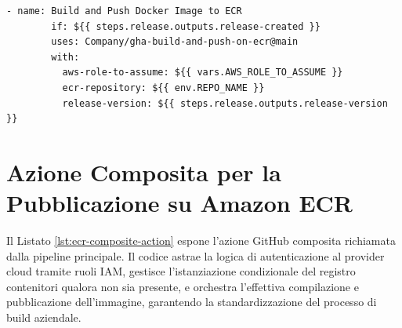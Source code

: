 \begin{lstlisting}[label={lst:ci-workflow}]
      - name: Build and Push Docker Image to ECR
        if: ${{ steps.release.outputs.release-created }}
        uses: Company/gha-build-and-push-on-ecr@main
        with:
          aws-role-to-assume: ${{ vars.AWS_ROLE_TO_ASSUME }}
          ecr-repository: ${{ env.REPO_NAME }}
          release-version: ${{ steps.release.outputs.release-version }}
\end{lstlisting}


\section{Azione Composita per la Pubblicazione su Amazon ECR}
Il Listato \ref{lst:ecr-composite-action} espone l'azione GitHub composita richiamata dalla pipeline principale. Il codice astrae la logica di autenticazione al provider cloud tramite ruoli IAM, gestisce l'istanziazione condizionale del registro contenitori qualora non sia presente, e orchestra l'effettiva compilazione e pubblicazione dell'immagine, garantendo la standardizzazione del processo di build aziendale.

